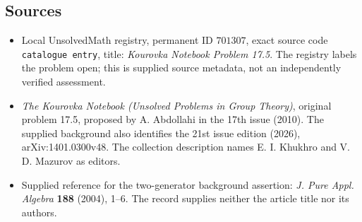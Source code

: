\documentclass[11pt]{article}
\begin{document}
\subsection{Sources}
\begin{itemize}
\item Local UnsolvedMath registry, permanent ID \(701307\), exact source code \texttt{catalogue entry}, title: \emph{Kourovka Notebook Problem 17.5}. The registry labels the problem open; this is supplied source metadata, not an independently verified assessment.
\item \emph{The Kourovka Notebook (Unsolved Problems in Group Theory)}, original problem 17.5, proposed by A. Abdollahi in the 17th issue (2010). The supplied background also identifies the 21st issue edition (2026), arXiv:1401.0300v48. The collection description names E. I. Khukhro and V. D. Mazurov as editors.
\item Supplied reference for the two-generator background assertion: \emph{J. Pure Appl. Algebra} \textbf{188} (2004), 1--6. The record supplies neither the article title nor its authors.
\end{itemize}
\end{document}
